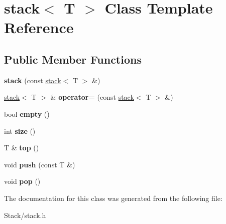 \hypertarget{classstack}{}\section{stack$<$ T $>$ Class Template Reference}
\label{classstack}
\subsection*{Public Member Functions}
\begin{DoxyCompactItemize}
\item 
\hypertarget{classstack_a2ac4beee237e53625290c15afd3a636a}{}{\bfseries stack} (const \hyperlink{classstack}{stack}$<$ T $>$ \&)\label{classstack_a2ac4beee237e53625290c15afd3a636a}

\item 
\hypertarget{classstack_ad4085b42329de4eb6fb1128d21b89359}{}\hyperlink{classstack}{stack}$<$ T $>$ \& {\bfseries operator=} (const \hyperlink{classstack}{stack}$<$ T $>$ \&)\label{classstack_ad4085b42329de4eb6fb1128d21b89359}

\item 
\hypertarget{classstack_ab82d4f94c3a83318499848de576feede}{}bool {\bfseries empty} ()\label{classstack_ab82d4f94c3a83318499848de576feede}

\item 
\hypertarget{classstack_a1577ac10f88c5d6bdbbd9f8f61344b91}{}int {\bfseries size} ()\label{classstack_a1577ac10f88c5d6bdbbd9f8f61344b91}

\item 
\hypertarget{classstack_a12b99509d933115ac110c2fbfea56e5c}{}T \& {\bfseries top} ()\label{classstack_a12b99509d933115ac110c2fbfea56e5c}

\item 
\hypertarget{classstack_a3920cecbc350ae7db943688b8c634719}{}void {\bfseries push} (const T \&)\label{classstack_a3920cecbc350ae7db943688b8c634719}

\item 
\hypertarget{classstack_ad6615a82d944ce2e9a9c260b1d126666}{}void {\bfseries pop} ()\label{classstack_ad6615a82d944ce2e9a9c260b1d126666}

\end{DoxyCompactItemize}


The documentation for this class was generated from the following file\+:\begin{DoxyCompactItemize}
\item 
Stack/stack.\+h\end{DoxyCompactItemize}
